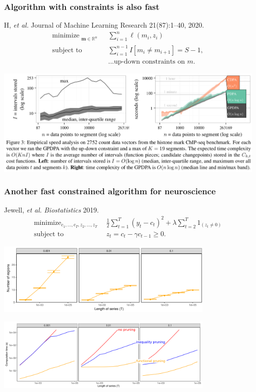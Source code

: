 \documentclass{beamer}
\DeclareMathOperator*{\minimize}{minimize}
\newcommand{\RR}{\mathbb R}
\begin{document}
\begin{frame}
  \frametitle{Algorithm with constraints is also fast}
  H, {\it et al.} Journal of Machine Learning Research 21(87):1--40, 2020. 
\vskip -0.5cm
  \begin{align*}
    \minimize_{\substack{
  \mathbf m\in\RR^{n}
  }} &\ \ 
    \sum_{i=1}^n \ell( m_i,  z_i) 
\\
      \text{subject to} &\ \ {{\sum_{i=1}^{n-1} I[m_i\neq m_{i+1}]}=S-1,}
  \nonumber\\
  &\ \ \text{...up-down constraints on $m$.}
  \nonumber 
\end{align*}

\includegraphics[width=\textwidth]{screenshot-GPDPA-intervals}

\end{frame}


\begin{frame}
  \frametitle{Another fast constrained algorithm for neuroscience}
  Jewell, {\it et al.} {\it Biostatistics} 2019.
\vskip -0.5cm
\begin{align*}
    \minimize_{c_1,\dots,c_T, z_2, \dots, z_T} &\ \ 
    \frac 1 2 \sum_{t=1}^T (y_t-c_t)^2  + 
\lambda\sum_{t=2}^{T} 1_{(z_t\neq 0)}
\\
      \text{subject to} &\ \ z_t = c_t - \gamma c_{t-1} \geq 0.
  \nonumber 
\end{align*}

\centering

\includegraphics[width=0.8\textwidth]{screenshot-jewell-intervals}

\includegraphics[width=0.8\textwidth]{screenshot-jewell-timings-labels}
  
\end{frame}
\end{document}
